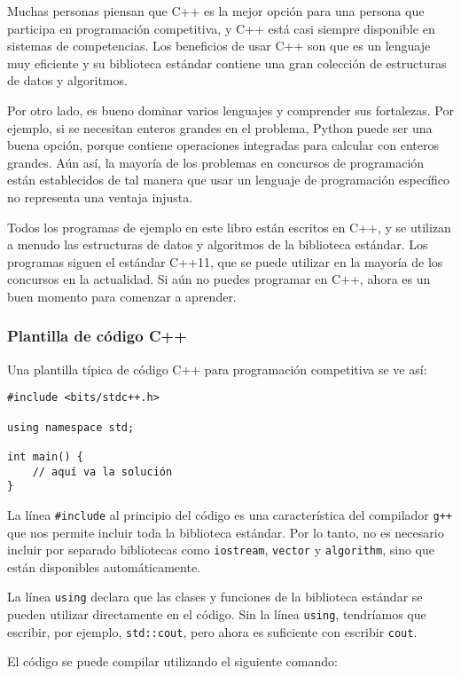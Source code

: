 Muchas personas piensan que C++ es la mejor opción
para una persona que participa en programación competitiva,
y C++ está casi siempre disponible en
sistemas de competencias.
Los beneficios de usar C++ son que
es un lenguaje muy eficiente y
su biblioteca estándar contiene una
gran colección
de estructuras de datos y algoritmos.

Por otro lado, es bueno
dominar varios lenguajes y comprender
sus fortalezas.
Por ejemplo, si se necesitan enteros grandes
en el problema,
Python puede ser una buena opción, porque
contiene operaciones integradas para
calcular con enteros grandes.
Aún así, la mayoría de los problemas en concursos de programación
están establecidos de tal manera que
usar un lenguaje de programación específico
no representa una ventaja injusta.

Todos los programas de ejemplo en este libro están escritos en C++,
y se utilizan a menudo las estructuras de datos y algoritmos
de la biblioteca estándar.
Los programas siguen el estándar C++11,
que se puede utilizar en la mayoría de los concursos en la actualidad.
Si aún no puedes programar en C++, 
ahora es un buen momento para comenzar a aprender.

\subsubsection{Plantilla de código C++}

Una plantilla típica de código C++ para programación competitiva
se ve así:

\begin{lstlisting}
#include <bits/stdc++.h>

using namespace std;

int main() {
    // aquí va la solución
}
\end{lstlisting}

La línea \texttt{\#include} al principio
del código es una característica del compilador \texttt{g++}
que nos permite incluir toda la biblioteca estándar.
Por lo tanto, no es necesario incluir por separado
bibliotecas como \texttt{iostream},
\texttt{vector} y \texttt{algorithm},
sino que están disponibles automáticamente.

La línea \texttt{using} declara
que las clases y funciones
de la biblioteca estándar se pueden utilizar directamente
en el código.
Sin la línea \texttt{using}, tendríamos
que escribir, por ejemplo, \texttt{std::cout},
pero ahora es suficiente con escribir \texttt{cout}.

El código se puede compilar utilizando el siguiente comando:

